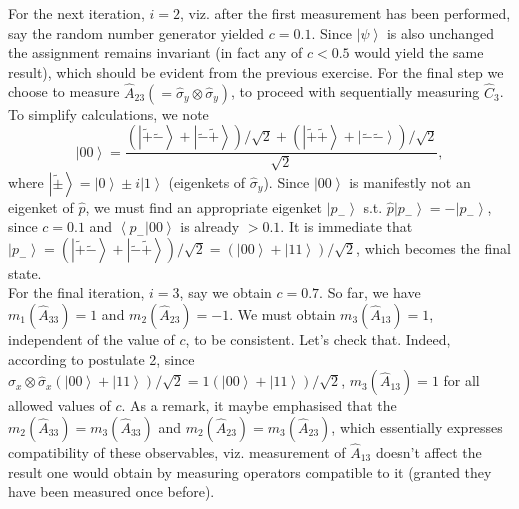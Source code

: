 \documentclass[british,aps,prl,superscriptaddress,nofootinbib,times,reprint]{revtex4-1}
\theoremstyle{plain}
\theoremstyle{definition}
\theoremstyle{remark}
\theoremstyle{plain}
\theoremstyle{plain}
\theoremstyle{plain}
\theoremstyle{definition}
\theoremstyle{definition}
\begin{document}
For the next iteration, $i=2$, viz.
after the first measurement has been performed,
say the random number generator yielded $c=0.1$.
Since $\left|\psi\right\rangle $ is also unchanged
the assignment remains invariant (in fact any of
$c<0.5$ would yield the same result), which should
be evident from the previous exercise. For the
final step we choose to measure
$\hat{A}_{23}(=\hat{\sigma}_{y}\otimes\hat{\sigma}_{y})$,
to proceed with sequentially measuring
$\hat{C}_{3}$. To simplify calculations, we note
\[ \left|00\right\rangle
=\frac{(\left|\tilde{+}\tilde{-}\right\rangle
+\left|\tilde{-}\tilde{+}\right\rangle
)/\sqrt{2}+(\left|\tilde{+}\tilde{+}\right\rangle
+\left|\tilde{-}\tilde{-}\right\rangle
)/\sqrt{2}}{\sqrt{2}}, \] where
$\left|\tilde{\pm}\right\rangle
=\left|0\right\rangle \pm i\left|1\right\rangle $
(eigenkets of $\hat{\sigma}_{y}$). Since
$\left|00\right\rangle $ is manifestly not an
eigenket of $\hat{p}$, we must find an appropriate
eigenket $\left|p_{-}\right\rangle $ s.t.
$\hat{p}\left|p_{-}\right\rangle
=-\left|p_{-}\right\rangle $, since $c=0.1$ and
$\left\langle p_{-}|00\right\rangle $ is already
$>0.1$. It is immediate that
$\left|p_{-}\right\rangle
=\left(\left|\tilde{+}\tilde{-}\right\rangle
+\left|\tilde{-}\tilde{+}\right\rangle
\right)/\sqrt{2}=\left(\left|00\right\rangle
+\left|11\right\rangle \right)/\sqrt{2}$, which
becomes the final state. \\ For the final
iteration, $i=3$, say we obtain $c=0.7$. So far,
we have $m_{1}(\hat{A}_{33})=1$ and
$m_{2}(\hat{A}_{23})=-1$. We must obtain
$m_{3}(\hat{A}_{13})=1$, independent of the value
of $c$, to be consistent. Let's check that.
Indeed, according to postulate 2, since
$\hat{\sigma}_{x}\otimes\hat{\sigma}_{x}\left(\left|00\right\rangle
+\left|11\right\rangle
\right)/\sqrt{2}=1\left(\left|00\right\rangle
+\left|11\right\rangle \right)/\sqrt{2}$,
$m_{3}(\hat{A}_{13})=1$ for all allowed values of
$c$. As a remark, it maybe emphasised that the
$m_{2}(\hat{A}_{33})=m_{3}(\hat{A}_{33})$ and
$m_{2}(\hat{A}_{23})=m_{3}(\hat{A}_{23})$, which
essentially expresses compatibility of these
observables, viz. measurement of $\hat{A}_{13}$
doesn't affect the result one would obtain by
measuring operators compatible to it (granted they
have been measured once before).
\end{document}
